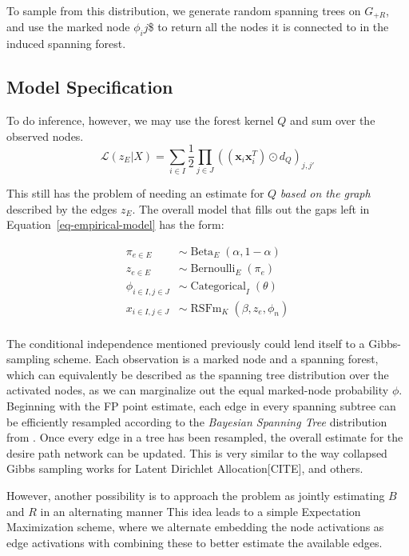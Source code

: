 \documentclass[%
	12pt,
		oneside,
		letterpaper
]{book}
\begin{document}
To sample from this distribution, we generate random spanning trees on
\(G_{+R}\), and use the marked node \(\phi_ij\)\$ to return all the
nodes it is connected to in the induced spanning forest.

\subsection{Model Specification}\label{sec-lfa-gibbs}

To do inference, however, we may use the forest kernel \(Q\) and sum
over the observed nodes. \[
\mathcal{L}(z_E | X) = \sum_{i\in I} \frac{1}{2} \prod_{j\in J} ((\mathbf{x}_i\mathbf{x}_i^T)\odot d_Q)_{j,j'}
\]

This still has the problem of needing an estimate for \(Q\) \emph{based
on the graph} described by the edges \(z_E\). The overall model that
fills out the gaps left in Equation~\ref{eq-empirical-model} has the
form:

\[
\begin{aligned}
\pi_{e\in E} &\sim \operatorname{Beta}_E(\alpha, 1-\alpha)     \\
z_{e\in E} &\sim \operatorname{Bernoulli}_E(\pi_e)             \\
\phi_{i\in I, j\in J} &\sim \operatorname{Categorical}_I(\theta) \\
x_{i\in I,j\in J} &\sim \operatorname{RSFm}_K(\beta, z_e, \phi_n) \\
\end{aligned}
\]

The conditional independence mentioned previously could lend itself to a
Gibbs-sampling scheme. Each observation is a marked node and a spanning
forest, which can equivalently be described as the spanning tree
distribution over the activated nodes, as we can marginalize out the
equal marked-node probability \(\phi\). Beginning with the FP point
estimate, each edge in every spanning subtree can be efficiently
resampled according to the \emph{Bayesian Spanning Tree} distribution
from \textcite{BayesianSpanningTree_Duan2021}. Once every edge in a tree
has been resampled, the overall estimate for the desire path network can
be updated. This is very similar to the way collapsed Gibbs sampling
works for Latent Dirichlet Allocation{[}CITE{]}, and others.

However, another possibility is to approach the problem as jointly
estimating \(B\) and \(R\) in an alternating manner This idea leads to a
simple Expectation Maximization scheme, where we alternate embedding the
node activations as edge activations with combining these to better
estimate the available edges.
\end{document}
